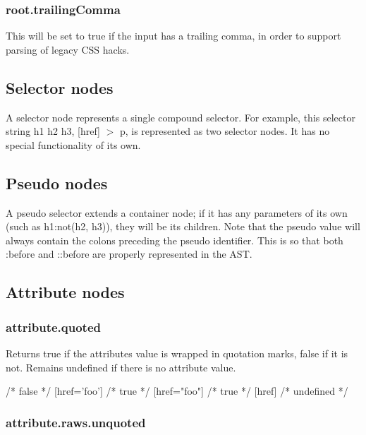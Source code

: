 \subsubsection*{{\ttfamily root.\+trailing\+Comma}}

This will be set to {\ttfamily true} if the input has a trailing comma, in order to support parsing of legacy C\+SS hacks.

\subsection*{Selector nodes}

A selector node represents a single compound selector. For example, this selector string {\ttfamily h1 h2 h3, \mbox{[}href\mbox{]} $>$ p}, is represented as two selector nodes. It has no special functionality of its own.

\subsection*{Pseudo nodes}

A pseudo selector extends a container node; if it has any parameters of its own (such as {\ttfamily h1\+:not(h2, h3)}), they will be its children. Note that the pseudo {\ttfamily value} will always contain the colons preceding the pseudo identifier. This is so that both {\ttfamily \+:before} and {\ttfamily \+::before} are properly represented in the A\+ST.

\subsection*{Attribute nodes}

\subsubsection*{{\ttfamily attribute.\+quoted}}

Returns {\ttfamily true} if the attribute\textquotesingle{}s value is wrapped in quotation marks, false if it is not. Remains {\ttfamily undefined} if there is no attribute value.


\begin{DoxyCode}
[href=foo] /* false */
[href='foo'] /* true */
[href="foo"] /* true */
[href] /* undefined */
\end{DoxyCode}


\subsubsection*{{\ttfamily attribute.\+raws.\+unquoted}}

